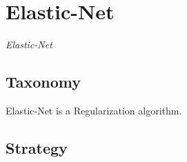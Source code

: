 
\section{Elastic-Net} 
\label{sec:elasticnet}

\emph{Elastic-Net}

\subsection{Taxonomy}
Elastic-Net is a Regularization algorithm.



\subsection{Strategy}







